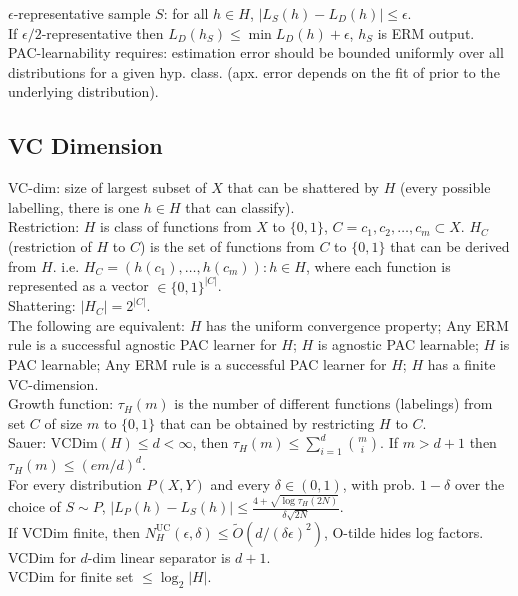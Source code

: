 $\epsilon$-representative sample $S$: for all $h \in H$, $|L_S(h) - L_D(h)| \leq \epsilon$.\\
If $\epsilon / 2$-representative then $L_D(h_S) \leq \min L_D(h) + \epsilon$, $h_S$ is ERM output.\\
PAC-learnability requires: estimation error should be bounded uniformly over all distributions for a given hyp. class. (apx. error depends on the fit of prior to the underlying distribution).

\subsection*{VC Dimension}

VC-dim: size of largest subset of $X$ that can be shattered by $H$ (every possible labelling, there is one $h \in H$ that can classify).\\
Restriction: $H$ is class of functions from $X$ to $\{0, 1\}$, $C={c_1, c_2, \dots, c_m} \subset X$. $H_C$ (restriction of $H$ to $C$) is the set of functions from $C$ to $\{0, 1\}$ that can be derived from $H$. i.e. $H_C = {(h(c_1), \dots, h(c_m)): h\in H}$, where each function is represented as a vector $\in \{0, 1\}^{|C|}$.\\
Shattering: $|H_C| = 2^{|C|}$.\\
The following are equivalent: $H$ has the uniform convergence property; Any ERM rule is a successful agnostic PAC learner for $H$; $H$ is agnostic PAC learnable; $H$ is PAC learnable; Any ERM rule is a successful PAC learner for $H$; $H$ has a finite VC-dimension.\\
Growth function: $\tau_H(m)$ is the number of different functions (labelings) from set $C$ of size $m$ to $\{0, 1\}$ that can be obtained by restricting $H$ to $C$.\\
Sauer: $\text{VCDim}(H) \leq d < \infty$, then $\tau_H(m) \leq \sum_{i=1}^d \binom{m}{i}$. If $m > d + 1$ then $\tau_H(m) \leq (em/d)^d$.\\
For every distribution $P(X, Y)$ and every $\delta \in (0, 1)$, with prob. $1 - \delta$ over the choice of $S \sim P$, $|L_P(h) - L_S(h)| \leq \frac{4 + \sqrt{\log \tau_H(2N)}}{\delta \sqrt{2N}}$.\\
If VCDim finite, then $N_{H}^{\text{UC}}(\epsilon, \delta) \leq \widetilde{O}(d/(\delta \epsilon)^2)$, O-tilde hides log factors.\\
VCDim for $d$-dim linear separator is $d+1$.\\
VCDim for finite set $\leq \log_2|H|$.

